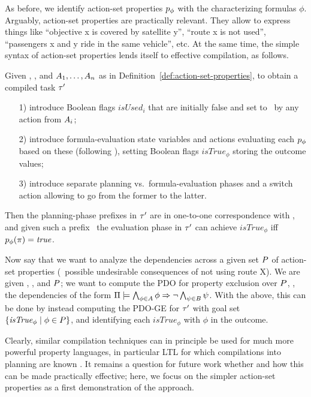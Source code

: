As before, we identify action-set properties $p_\phi$ with the
characterizing formulas $\phi$. Arguably, action-set properties are
practically relevant. They allow to express things like ``objective x
is covered by satellite y'', %
%
``route x is not used'',
%
``passengers x and y ride in the same vehicle'',
%
etc. At the same time, the simple syntax of action-set
properties lends itself to effective compilation, as follows.

Given \task, \plans, and $A_1, \dots, A_n$ as in
Definition~\ref{def:action-set-properties}, to obtain a compiled task
$\tau'$
\begin{itemize}
\item[1)] introduce Boolean flags $\mathit{isUsed}_i$ that are
  initially false and set to \true\ by any action from $A_i$;
\item[2)] introduce formula-evaluation state variables and actions
  evaluating each $p_\phi$ based on these (following
  \cite{gazen:knoblock:ecp-97,nebel:jair-00}), setting Boolean flags
  $\mathit{isTrue}_\phi$ storing the outcome values;
\item[3)] introduce separate planning vs.\ formula-evaluation phases
  and a switch action allowing to go from the former to the latter.
\end{itemize}
Then the planning-phase prefixes in $\tau'$ are in one-to-one
correspondence with \plans, and given such a prefix \plan\ the
evaluation phase in $\tau'$ can achieve $\mathit{isTrue}_\phi$ iff
$p_\phi(\pi) = \mathit{true}$.

Now say that we want to analyze the dependencies across a given set
$P$ of action-set properties (\eg\ possible undesirable
consequences of not using route X). We are given \task, \plans, and
$P$; we want to compute the PDO for property exclusion over
$P$, \ie, the dependencies of the form
$\Pi \models \bigwedge_{\phi \in A} \phi \Rightarrow \neg \bigwedge_{\psi
    \in B} \psi$. With the above, this can be done by instead
computing the PDO-GE for $\tau'$ with goal set
$\{\mathit{isTrue}_\phi \mid \phi \in P\}$, and identifying each
$\mathit{isTrue}_\phi$ with $\phi$ in the outcome.

Clearly, similar compilation techniques can in principle be used for
much more powerful property languages, in particular LTL for which
compilations into planning are known
\cite{edelkamp:icaps-06,baier:etal:ai-09}. It remains a question for
future work whether and how this can be made practically effective;
here, we focus on the simpler action-set properties as a first
demonstration of the approach.





